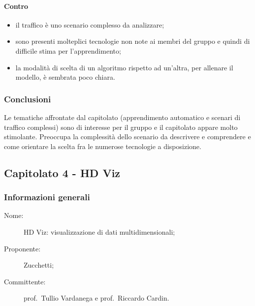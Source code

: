 \paragraph*{Contro}
\begin{itemize}
	\item il traffico è uno scenario complesso da analizzare;
	\item sono presenti molteplici tecnologie non note ai membri del gruppo e quindi di difficile stima per l'apprendimento;
	\item la modalità di scelta di un algoritmo rispetto ad un'altra, per allenare il modello, è sembrata poco chiara.
\end{itemize}
\subsubsection{Conclusioni}
Le tematiche affrontate dal capitolato (apprendimento automatico e scenari di traffico complessi) sono di interesse per il gruppo e il capitolato appare molto stimolante. Preoccupa la complessità dello scenario da descrivere e comprendere e come orientare la scelta fra le numerose tecnologie a disposizione.

\subsection{Capitolato 4 - HD Viz}
\subsubsection{Informazioni generali}
\begin{description}
	\item[Nome:] HD Viz: visualizzazione di dati multidimensionali;
	\item[Proponente:] Zucchetti;
	\item[Committente:] prof.~Tullio Vardanega e prof.~Riccardo Cardin.
\end{description}

